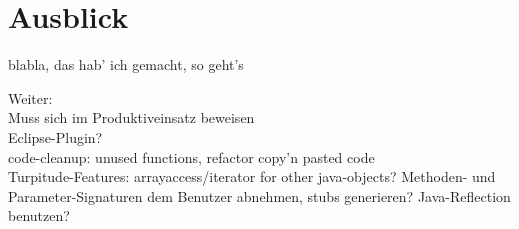 \chapter{Ausblick}
\label{sec:extro}
blabla, das hab' ich gemacht, so geht's

Weiter: \\
Muss sich im Produktiveinsatz beweisen\\
Eclipse-Plugin?\\
code-cleanup: unused functions, refactor copy'n pasted code\\
Turpitude-Features: arrayaccess/iterator for other java-objects? 
Methoden- und Parameter-Signaturen dem Benutzer abnehmen, stubs generieren? Java-Reflection benutzen?\\




